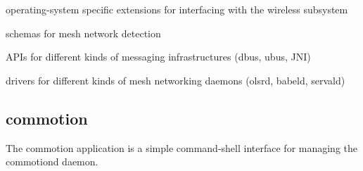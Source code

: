 \begin{DoxyItemize}
\item operating-\/system specific extensions for interfacing with the wireless subsystem
\item schemas for mesh network detection
\item A\-P\-Is for different kinds of messaging infrastructures (dbus, ubus, J\-N\-I)
\item drivers for different kinds of mesh networking daemons (olsrd, babeld, servald)
\end{DoxyItemize}

\subsection*{commotion }

The commotion application is a simple command-\/shell interface for managing the commotiond daemon. 